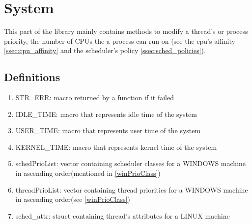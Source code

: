 \section{System}
This part of the library mainly contains methods to modify a thread's or process priority, the number of CPUs the a process can run on (see the cpu's affinity \ref{ssec:cpu_affinity} and the scheduler's policy \ref{ssec:sched_policies}).
\subsection{Definitions}
\begin{enumerate}
	\item STR\_ERR: macro returned by a function if it failed
	\item IDLE\_TIME: macro that represents idle time of the system
	\item USER\_TIME: macro that represents user time of the system
	\item KERNEL\_TIME: macro that represents kernel time of the system
	\item schedPrioList: vector containing scheduler classes for a WINDOWS machine in ascending order(mentioned in \ref*{winPrioClass})
	\item threadPrioList: vector containing thread priorities for a WINDOWS machine in ascending order(see \ref*{winPrioClass})
	\item sched\_attr: struct containing thread's attributes for a LINUX machine
\end{enumerate}
